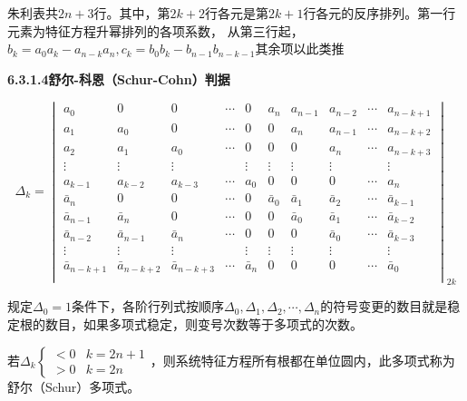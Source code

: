 \documentclass[11pt,a4paper]{ctexart}
\begin{document}
            朱利表共$2n+3$行。其中，第$2k+2$行各元是第$2k+1$行各元的反序排列。第一行元素为特征方程升幂排列的各项系数，
            从第三行起，$b_k=a_0a_k-a_{n-k}a_n,c_k=b_0b_k-b_{n-1}b_{n-k-1}$其余项以此类推

            {\setlength{\parindent}{0pt}\textbf{6.3.1.4\quad 舒尔-科恩（Schur-Cohn）判据}}

            \[
            \Delta_k=\begin{vmatrix}
                a_0 & 0 & 0 & \cdots & 0 & a_n & a_{n-1} & a_{n-2} & \cdots & a_{n-k+1} \\
                a_1 & a_0 & 0 & \cdots & 0 & 0 & a_n & a_{n-1} & \cdots & a_{n-k+2} \\
                a_2 & a_1 & a_0 & \cdots & 0 & 0 & 0 & a_n & \cdots & a_{n-k+3} \\
                \vdots & \vdots & \vdots &  & \vdots & \vdots & \vdots & \vdots &  & \vdots \\
                a_{k-1} & a_{k-2} & a_{k-3} & \cdots & a_0 & 0 & 0 & 0 & \cdots & a_n \\
                \bar a_n & 0 & 0 & \cdots & 0 & \bar a_0 & \bar a_1 & \bar a_2 & \cdots & \bar a_{k-1} \\
                \bar a_{n-1} & \bar a_n & 0 & \cdots & 0 & 0 & \bar a_0 & \bar a_1 & \cdots & \bar a_{k-2} \\
                \bar a_{n-2} & \bar a_{n-1} & \bar a_n & \cdots & 0 & 0 & 0 & \bar a_0 & \cdots & \bar a_{k-3} \\
                \vdots & \vdots & \vdots &  & \vdots & \vdots & \vdots & \vdots &  & \vdots \\
                \bar a_{n-k+1} & \bar a_{n-k+2} & \bar a_{n-k+3} & \cdots & \bar a_n & 0 & 0 & 0 & \cdots & \bar a_0 \\
            \end{vmatrix}_{2k}
            \]        

            规定$\Delta_0=1$条件下，各阶行列式按顺序$\Delta_0,\Delta_1,\Delta_2,\cdots,\Delta_n$的符号变更的数目就是稳定根的数目，如果多项式稳定，则变号次数等于多项式的次数。

            若$\Delta_k\begin{cases}<0&k=2n+1\\>0&k=2n\end{cases}$，则系统特征方程所有根都在单位圆内，此多项式称为舒尔（Schur）多项式。
\end{document}
